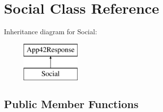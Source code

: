\hypertarget{class_social}{\section{Social Class Reference}
\label{class_social}
}
Inheritance diagram for Social\+:\begin{figure}[H]
\begin{center}
\leavevmode
\includegraphics[height=2.000000cm]{class_social}
\end{center}
\end{figure}
\subsection*{Public Member Functions}
